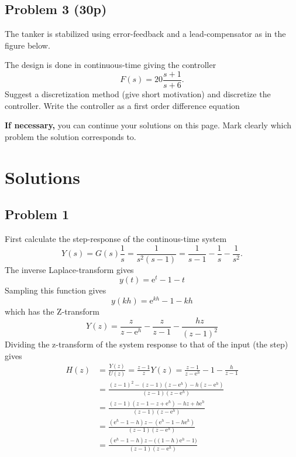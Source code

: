 \documentclass[a4paper,12pt]{article}
\newcommand{\bmpl}{\begin{minipage}[t]{140mm}}
\newcommand{\emp}{\end{minipage}}
\newcommand*{\mexp}[1]{\ensuremath{\mathrm{e}^{#1}}}
\begin{document}
\noindent
\fbox{
\bmpl
{\bf Calculations:}\\
\vspace*{90mm}
\emp}

\clearpage

\subsection*{Problem 3 (30p)}
The tanker is stabilized using error-feedback and a lead-compensator as in the figure below. 
\begin{center}
  
\end{center}
The design is done in continuous-time giving the controller
\[ F(s) = 20 \frac{s+1}{s+6}. \]
Suggest a discretization method (give short motivation) and discretize the controller. Write the controller as a first order difference equation

\noindent
\fbox{
\bmpl
{\bf Solutions:}\\
\vspace*{140mm}
\emp}

\clearpage

\noindent
{\bf If necessary,} you can continue your solutions on this page. Mark clearly which problem the solution corresponds to.



\newpage
\setcounter{page}{1}

\section*{Solutions}
\subsection*{Problem 1}
   First calculate the step-response of the continous-time system
   \[Y(s) = G(s)\frac{1}{s} = \frac{1}{s^2(s-1)} = \frac{1}{s-1} - \frac{1}{s} - \frac{1}{s^2}.\]
   The inverse Laplace-transform gives
   \[ y(t) = \mexp{t} - 1 - t\]
   Sampling this function gives
   \[ y(kh) = \mexp{kh} -1 - kh\]
   which has the Z-transform
   \[Y(z) = \frac{z}{z - \mexp{h}} - \frac{z}{z-1} - \frac{hz}{(z-1)^2}\]
   Dividing the z-transform of the system response to that of the input (the step) gives
   \begin{align*}
   H(z) &= \frac{Y(z)}{U(z)} = \frac{z-1}{z}Y(z) = \frac{z-1}{z-\mexp{h}} - 1 - \frac{h}{z-1}\\
        &= \frac{(z-1)^2 - (z-1)(z-\mexp{h}) - h(z-\mexp{h})}{(z-1)(z-\mexp{h})}\\
	&= \frac{(z-1)(z-1 -z + \mexp{h}) - hz + h\mexp{h}}{(z-1)(z-\mexp{h})}\\
        &= \frac{ (\mexp{h} - 1 -h)z - (\mexp{h}-1-h\mexp{h})}{(z-1)(z-\mexp{h})}\\
        &= \frac{ (\mexp{h} - 1 -h)z - \big( (1-h)\mexp{h}-1\big)}{(z-1)(z-\mexp{h})}\\
   \end{align*}
\end{document}
